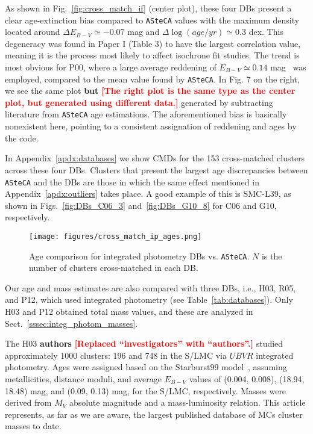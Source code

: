 \documentclass[draft]{aa}
\newcommand{\LEt}[1]{\textcolor{red}{\textbf{[#1]}}}
\renewcommand{\includegraphics}[2][]{}
\begin{document}
As shown in Fig.~\ref{fig:cross_match_if} (center plot), these four DBs
present a clear age-extinction bias compared to \texttt{ASteCA} values with the
maximum density located around $\Delta E_{B-V}{\simeq-}0.07$ mag and
$\Delta\log(age/yr){\simeq}0.3$ dex.
This degeneracy was found in Paper I (Table 3) to have the largest
correlation value, meaning it is the process most likely to affect isochrone fit
studies.
The trend is most obvious for P00, where a large average reddening of
$E_{B-V}{\simeq}0.14$ mag~\citep{de_Grijs_2006} was employed, compared to the
mean value found by \texttt{ASteCA}.
%
In Fig. 7 on the right, we see the same plot \textbf{but} \LEt{The right plot
is the same type as the center plot, but generated using different data.}
generated by subtracting literature from \texttt{ASteCA} age estimations.
The aforementioned bias is basically nonexistent here, pointing to a
consistent assignation of reddening and ages by the code.

In Appendix~\ref{apdx:databases} we show CMDs for the 153 cross-matched
clusters across these four DBs.
Clusters that present the largest age discrepancies between
\texttt{ASteCA} and the DBs are those in which the same effect mentioned in
Appendix~\ref{apdx:outliers} takes place. A good example of this is SMC-L39, as
shown in Figs.~\ref{fig:DBs_C06_3} and~\ref{fig:DBs_G10_8} for C06 and G10,
respectively.\\


%

\begin{figure}
\centering
\texttt{[image: figures/cross\_match\_ip\_ages.png]}
\caption{Age comparison for integrated photometry DBs vs. \texttt{ASteCA}.
$N$ is the number of clusters cross-matched in each DB.\@}
\label{fig:cross_match_ip_age}
\end{figure}

Our age and mass estimates are also compared with three DBs, i.e., H03, R05, and P12, which used integrated photometry (see Table~\ref{tab:databases}). Only H03
and P12 obtained total mass values, and these are analyzed in
Sect.~\ref{sssec:integ_photom_masses}.

The H03 \textbf{authors} \LEt{Replaced ``investigators'' with ``authors''.}
studied approximately 1000 clusters: 196 and 748 in the
S/LMC via $UBVR$ integrated photometry.
Ages were assigned based on the Starburst99 model~\citep{Leitherer_1999},
assuming metallicities, distance moduli, and average $E_{B-V}$ values of (0.004,
0.008), (18.94, 18.48) mag, and  (0.09, 0.13) mag, for the S/LMC, respectively.
%
Masses were derived from $M_V$ absolute magnitude and a mass-luminosity
relation.
This article represents, as far as we are aware, the largest published database
of MCs cluster masses to date.
\end{document}
